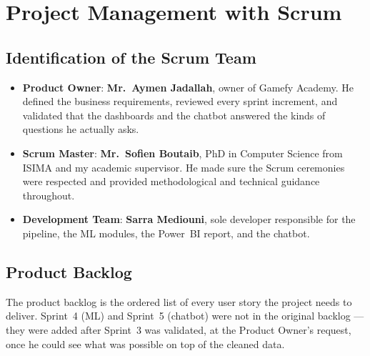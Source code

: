 \documentclass[12pt, a4paper]{report}
\begin{document}
\section{Project Management with Scrum}

\subsection{Identification of the Scrum Team}

\begin{itemize}
  \item \textbf{Product Owner}: \textbf{Mr.\ Aymen Jadallah}, owner of Gamefy
        Academy. He defined the business requirements, reviewed every sprint
        increment, and validated that the dashboards and the chatbot answered
        the kinds of questions he actually asks.

  \item \textbf{Scrum Master}: \textbf{Mr.\ Sofien Boutaib}, PhD in Computer
        Science from ISIMA and my academic supervisor. He made sure the Scrum
        ceremonies were respected and provided methodological and technical
        guidance throughout.

  \item \textbf{Development Team}: \textbf{Sarra Mediouni}, sole developer
        responsible for the pipeline, the ML modules, the Power~BI report,
        and the chatbot.
\end{itemize}

\subsection{Product Backlog}

The product backlog is the ordered list of every user story the project needs
to deliver. Sprint~4 (ML) and Sprint~5 (chatbot) were not in the original
backlog — they were added after Sprint~3 was validated, at the Product
Owner's request, once he could see what was possible on top of the cleaned
data.
\end{document}
